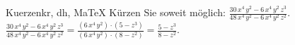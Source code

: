 \begin{MAufgabe}{Kuerzen}{kr, dh, MaTeX}
K\"urzen Sie soweit m\"oglich: $\frac{30\, x^4\, y^2 - 6\, x^4\, y^2\, z^3}{48\, x^4\, y^2 - 6\, x^4\, y^2\, z^2}$.\\ 
\ifLsg\MLoesung
\quad $\frac{30\, x^4\, y^2 - 6\, x^4\, y^2\, z^3}{48\, x^4\, y^2 - 6\, x^4\, y^2\, z^2}=\frac{(6\, x^4\, y^2)\cdot(5 - z^3)}{(6\, x^4\, y^2)\cdot(8 - z^2)}=\frac{5 - z^3}{8 - z^2}$.\else\relax\fi
 \end{MAufgabe}